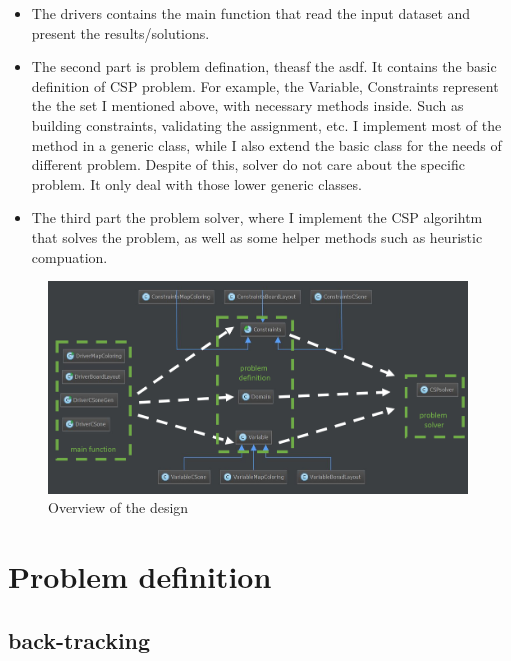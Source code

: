 \documentclass{article}
\begin{document}
\begin{itemize}
  \item The drivers contains the main function that read the input dataset and present the results/solutions.
  \item  The second part is problem defination, theasf the asdf. It contains the basic definition of CSP problem. For example, the Variable, Constraints represent the the set I mentioned above, with necessary methods inside. Such as building constraints, validating the assignment, etc. I implement most of the method in a generic class, while I also extend the basic class for the needs of different problem. Despite of this, solver do not care about the specific problem. It only deal with those lower generic classes.
  \item The third part the problem solver, where I implement the CSP algorihtm that solves the problem, as well as some helper methods such as heuristic compuation.
\end{itemize}
\begin{figure}[!h]
\centering
\includegraphics[width=0.99\textwidth]{class_layout.png}
\caption{Overview of the design}
\label{classlayout}
\end{figure}













\clearpage
\section{Problem definition}
\subsection{back-tracking}
\end{document}
